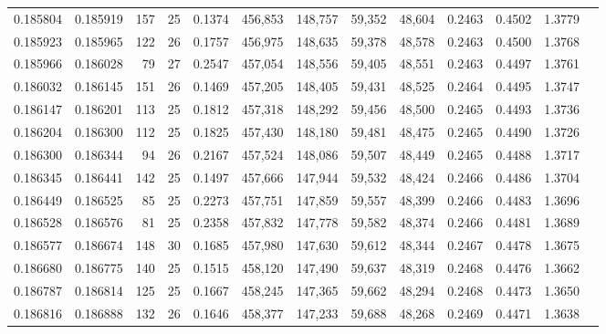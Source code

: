 \begin{tabular}{rrrrrrrrrrrrr}
0.185804 & 0.185919 & 157 &  25 &                                     0.1374 & 456,853 & 148,757 &  59,352 &  48,604 & 0.2463 & 0.4502 & 1.3779 \\
0.185923 & 0.185965 & 122 &  26 &                                     0.1757 & 456,975 & 148,635 &  59,378 &  48,578 & 0.2463 & 0.4500 & 1.3768 \\
0.185966 & 0.186028 &  79 &  27 &                                     0.2547 & 457,054 & 148,556 &  59,405 &  48,551 & 0.2463 & 0.4497 & 1.3761 \\
0.186032 & 0.186145 & 151 &  26 &                                     0.1469 & 457,205 & 148,405 &  59,431 &  48,525 & 0.2464 & 0.4495 & 1.3747 \\
0.186147 & 0.186201 & 113 &  25 &                                     0.1812 & 457,318 & 148,292 &  59,456 &  48,500 & 0.2465 & 0.4493 & 1.3736 \\
0.186204 & 0.186300 & 112 &  25 &                                     0.1825 & 457,430 & 148,180 &  59,481 &  48,475 & 0.2465 & 0.4490 & 1.3726 \\
0.186300 & 0.186344 &  94 &  26 &                                     0.2167 & 457,524 & 148,086 &  59,507 &  48,449 & 0.2465 & 0.4488 & 1.3717 \\
0.186345 & 0.186441 & 142 &  25 &                                     0.1497 & 457,666 & 147,944 &  59,532 &  48,424 & 0.2466 & 0.4486 & 1.3704 \\
0.186449 & 0.186525 &  85 &  25 &                                     0.2273 & 457,751 & 147,859 &  59,557 &  48,399 & 0.2466 & 0.4483 & 1.3696 \\
0.186528 & 0.186576 &  81 &  25 &                                     0.2358 & 457,832 & 147,778 &  59,582 &  48,374 & 0.2466 & 0.4481 & 1.3689 \\
0.186577 & 0.186674 & 148 &  30 &                                     0.1685 & 457,980 & 147,630 &  59,612 &  48,344 & 0.2467 & 0.4478 & 1.3675 \\
0.186680 & 0.186775 & 140 &  25 &                                     0.1515 & 458,120 & 147,490 &  59,637 &  48,319 & 0.2468 & 0.4476 & 1.3662 \\
0.186787 & 0.186814 & 125 &  25 &                                     0.1667 & 458,245 & 147,365 &  59,662 &  48,294 & 0.2468 & 0.4473 & 1.3650 \\
0.186816 & 0.186888 & 132 &  26 &                                     0.1646 & 458,377 & 147,233 &  59,688 &  48,268 & 0.2469 & 0.4471 & 1.3638 \\

\end{tabular}
